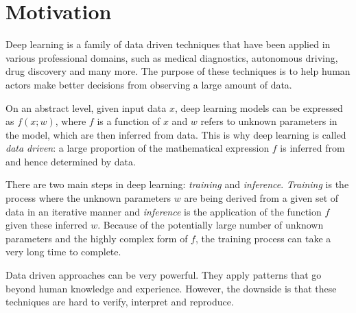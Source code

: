 \section{Motivation}


Deep learning is a family of data driven techniques that have been applied in various professional domains, such as medical diagnostics, autonomous driving, drug discovery and many more.
The purpose of these techniques is to help human actors make better decisions from observing a large amount of data.

On an abstract level, given input data $x$, deep learning models can be expressed as $f(x; w)$, where $f$ is a function of $x$ and $w$ refers to unknown parameters in the model, which are then inferred from data. This is why deep learning is called \emph{data driven}: a large proportion of the mathematical expression $f$ is inferred from and hence determined by data.

There are two main steps in deep learning: \emph{training} and \emph{inference}.
\emph{Training} is the process where the unknown parameters $w$ are being derived from a given set of data in an iterative manner and \emph{inference} is the application of the function $f$ given these inferred $w$. Because of the potentially large number of unknown parameters and the highly complex form of $f$, the training process can take a very long time to complete.

Data driven approaches can be very powerful. They apply patterns that go beyond human knowledge and experience. However, the downside is that these techniques are hard to verify, interpret and reproduce.

